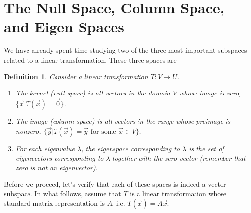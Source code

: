 \documentclass[10pt]{article}
\theoremstyle{plain}
\theoremstyle{box}
\newtheorem{definition}{Definition}
\begin{document}
\section{The Null Space, Column Space, and Eigen Spaces}
We have already spent time studying two of the three most important subspaces related to a linear transformation. These three spaces are 
\begin{definition} Consider a linear transformation $T:V\to U$.
\begin{enumerate}
	\item The kernel (null space) is all vectors in the domain $V$ whose image is zero, $\{\vec x | T(\vec x)=\vec 0\}$.
	\item The image (column space) is all vectors in the range whose preimage is nonzero, $\{\vec y | T(\vec x)=\vec y \text{ for some }\vec x \in V\}$.
	\item For each eigenvalue $\lambda$, the eigenspace corresponding to $\lambda$ is the set of eigenvectors corresponding to $\lambda$ together with the zero vector (remember that zero is not an eigenvector). 
\end{enumerate}
\end{definition}
Before we proceed, let's verify that each of these spaces is indeed a vector subspace. In what follows, assume that $T$ is a linear transformation whose standard matrix representation is $A$, i.e. $T(\vec x)=A\vec x$.  
\end{document}
